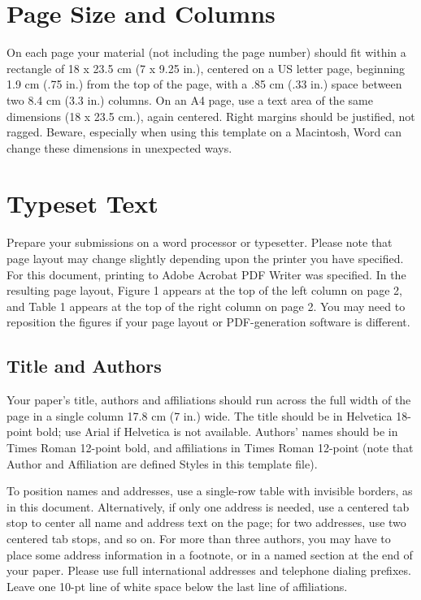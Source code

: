 \documentclass{chi2009}
\begin{document}
\section{Page Size and Columns}

On each page your material (not including the page number) should fit
within a rectangle of 18 x 23.5 cm (7 x 9.25 in.), centered on a US
letter page, beginning 1.9 cm (.75 in.) from the top of the page, with
a .85 cm (.33 in.) space between two 8.4 cm (3.3 in.) columns.  On an
A4 page, use a text area of the same dimensions (18 x 23.5 cm.), again
centered.  Right margins should be justified, not ragged. Beware,
especially when using this template on a Macintosh, Word can change
these dimensions in unexpected ways.

\section{Typeset Text}

Prepare your submissions on a word processor or typesetter.  Please
note that page layout may change slightly depending upon the printer
you have specified.  For this document, printing to Adobe Acrobat PDF
Writer was specified.  In the resulting page layout, Figure 1 appears
at the top of the left column on page 2, and Table 1 appears at the
top of the right column on page 2.  You may need to reposition the
figures if your page layout or PDF-generation software is different.

\subsection{Title and Authors}

Your paper's title, authors and affiliations should run across the
full width of the page in a single column 17.8 cm (7 in.) wide.  The
title should be in Helvetica 18-point bold; use Arial if Helvetica is
not available.  Authors' names should be in Times Roman 12-point bold,
and affiliations in Times Roman 12-point (note that Author and
Affiliation are defined Styles in this template file).

To position names and addresses, use a single-row table with invisible
borders, as in this document.  Alternatively, if only one address is
needed, use a centered tab stop to center all name and address text on
the page; for two addresses, use two centered tab stops, and so
on. For more than three authors, you may have to place some address
information in a footnote, or in a named section at the end of your
paper. Please use full international addresses and telephone dialing
prefixes.  Leave one 10-pt line of white space below the last line of
affiliations.
\end{document}
